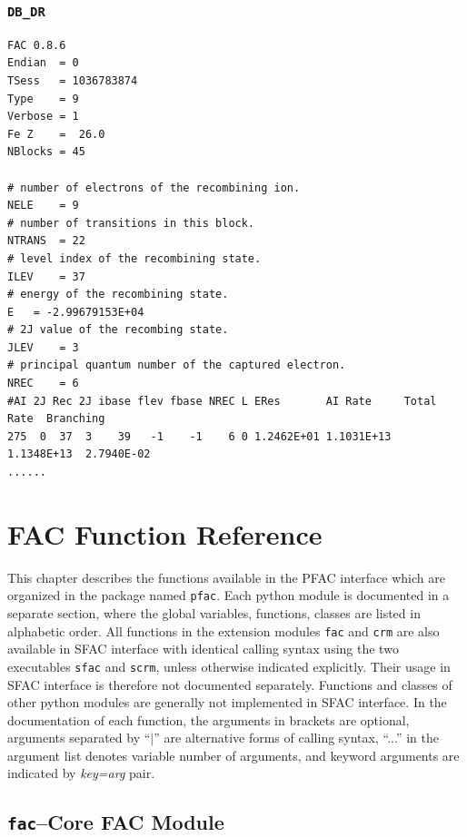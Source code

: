 \documentclass[twoside,letterpaper]{refrep}
\newcommand{\var}[1]{\textit{#1}}
\newcommand{\mod}[1]{\texttt{#1}}
\begin{document}
\subsection{\texttt{DB\_DR}}
\begin{verbatim}FAC 0.8.6
Endian	= 0
TSess	= 1036783874
Type	= 9
Verbose	= 1
Fe Z	=  26.0
NBlocks	= 45

# number of electrons of the recombining ion.
NELE	= 9
# number of transitions in this block.
NTRANS	= 22
# level index of the recombining state.
ILEV	= 37
# energy of the recombining state.
E	= -2.99679153E+04
# 2J value of the recombing state.
JLEV	= 3
# principal quantum number of the captured electron.
NREC	= 6
#AI 2J Rec 2J ibase flev fbase NREC L ERes       AI Rate     Total Rate  Branching
275  0  37  3    39   -1    -1    6 0 1.2462E+01 1.1031E+13  1.1348E+13  2.7940E-02
......
\end{verbatim}

\chapter{FAC Function Reference}
\label{cha:function}
This chapter describes the functions available in the PFAC interface which are
organized in the package named \mod{pfac}. Each
python module is documented in a separate section, where the global variables,
functions, classes are listed in alphabetic order. All functions in the
extension modules \mod{fac} and \mod{crm} are also available in SFAC interface
with identical calling syntax using the two executables \mod{sfac} and
\mod{scrm}, unless otherwise indicated explicitly. Their usage in SFAC
interface is therefore not documented separately. Functions and classes of
other python modules are generally not implemented in SFAC interface. In the
documentation of each function, the arguments in brackets are optional,
arguments separated by ``$|$'' are alternative forms of calling syntax,
``...'' in the argument list denotes variable number of arguments, and
keyword arguments are indicated by \var{key=arg} pair.

\section{\mod{fac}--Core FAC Module}
\label{sec:fac}
\end{document}

